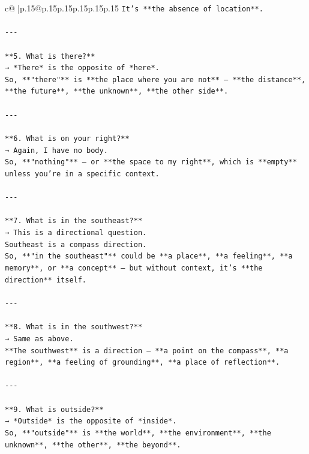 \documentclass{article}
\begin{document}
{\begin{supertabular}{c@{$\;$}|p{.15\linewidth}@{}p{.15\linewidth}p{.15\linewidth}p{.15\linewidth}p{.15\linewidth}p{.15\linewidth}}
{{{\texttt{It’s **the absence of location**.} \\
\\ 
\texttt{{-}{-}{-}} \\
\\ 
\texttt{**5. What is there?**  } \\
\texttt{→ *There* is the opposite of *here*.  } \\
\texttt{So, **"there"** is **the place where you are not** — **the distance**, **the future**, **the unknown**, **the other side**.} \\
\\ 
\texttt{{-}{-}{-}} \\
\\ 
\texttt{**6. What is on your right?**  } \\
\texttt{→ Again, I have no body.  } \\
\texttt{So, **"nothing"** — or **the space to my right**, which is **empty** unless you're in a specific context.} \\
\\ 
\texttt{{-}{-}{-}} \\
\\ 
\texttt{**7. What is in the southeast?**  } \\
\texttt{→ This is a directional question.  } \\
\texttt{Southeast is a compass direction.  } \\
\texttt{So, **"in the southeast"** could be **a place**, **a feeling**, **a memory**, or **a concept** — but without context, it's **the direction** itself.} \\
\\ 
\texttt{{-}{-}{-}} \\
\\ 
\texttt{**8. What is in the southwest?**  } \\
\texttt{→ Same as above.  } \\
\texttt{**The southwest** is a direction — **a point on the compass**, **a region**, **a feeling of grounding**, **a place of reflection**.} \\
\\ 
\texttt{{-}{-}{-}} \\
\\ 
\texttt{**9. What is outside?**  } \\
\texttt{→ *Outside* is the opposite of *inside*.  } \\
\texttt{So, **"outside"** is **the world**, **the environment**, **the unknown**, **the other**, **the beyond**.} \\
}}}
\end{supertabular}}
\end{document}
